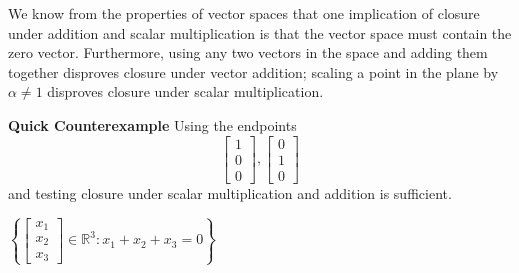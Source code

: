 \begin{enumerate}
{	We know from the properties of vector spaces that one implication of closure under addition and scalar multiplication is that the vector space must contain the zero vector. Furthermore, using any two vectors in the space and adding them together disproves closure under vector addition; scaling a point in the plane by $\alpha \neq 1$ disproves closure under scalar multiplication.

	\textbf{Quick Counterexample}
	Using the endpoints $$\begin{bmatrix}1\\0\\0\end{bmatrix}, \begin{bmatrix}0\\1\\0\end{bmatrix}$$ and testing closure under scalar multiplication and addition is sufficient.
}

\qitem\label{ques:notAffine}{
	$\left\{\begin{bmatrix}x_1\\x_2\\x_3\end{bmatrix} \in \mathbb{R}^3 : x_1 + x_2 + x_3 = 0\right\}$
}


\end{enumerate}
